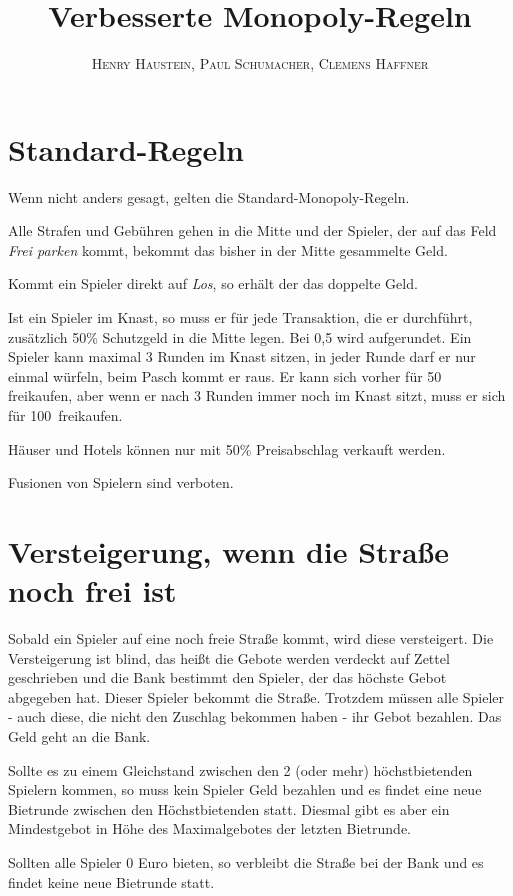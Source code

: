 \documentclass{article}
\title{\textbf{Verbesserte Monopoly-Regeln}}
\author{\textsc{Henry Haustein}, \textsc{Paul Schumacher}, \textsc{Clemens Haffner}}
\date{}
\begin{document}
	\maketitle
	
	\section{Standard-Regeln}
	Wenn nicht anders gesagt, gelten die Standard-Monopoly-Regeln. 
	
	Alle Strafen und Gebühren gehen in die Mitte und der Spieler, der auf das Feld \textit{Frei parken} kommt, bekommt das bisher in der Mitte gesammelte Geld. 
	
	Kommt ein Spieler direkt auf \textit{Los}, so erhält der das doppelte Geld. 
	
	Ist ein Spieler im Knast, so muss er für jede Transaktion, die er durchführt, zusätzlich 50\% Schutzgeld in die Mitte legen. Bei 0,5 wird aufgerundet. Ein Spieler kann maximal 3 Runden im Knast sitzen, in jeder Runde darf er nur einmal würfeln, beim Pasch kommt er raus. Er kann sich vorher für 50\EUR\, freikaufen, aber wenn er nach 3 Runden immer noch im Knast sitzt, muss er sich für 100\EUR\, freikaufen.
	
	Häuser und Hotels können nur mit 50\% Preisabschlag verkauft werden.
	
	Fusionen von Spielern sind verboten.
	
	\section{Versteigerung, wenn die Straße noch frei ist}
	\label{versteigerung}
	Sobald ein Spieler auf eine noch freie Straße kommt, wird diese versteigert. Die Versteigerung ist blind, das heißt die Gebote werden verdeckt auf Zettel geschrieben und die Bank bestimmt den Spieler, der das höchste Gebot abgegeben hat. Dieser Spieler bekommt die Straße. Trotzdem müssen alle Spieler - auch diese, die nicht den Zuschlag bekommen haben - ihr Gebot bezahlen. Das Geld geht an die Bank.
	
	Sollte es zu einem Gleichstand zwischen den 2 (oder mehr) höchstbietenden Spielern kommen, so muss kein Spieler Geld bezahlen und es findet eine neue Bietrunde zwischen den Höchstbietenden statt. Diesmal gibt es aber ein Mindestgebot in Höhe des Maximalgebotes der letzten Bietrunde.
	
	Sollten alle Spieler 0 Euro bieten, so verbleibt die Straße bei der Bank und es findet keine neue Bietrunde statt.
	
\end{document}
